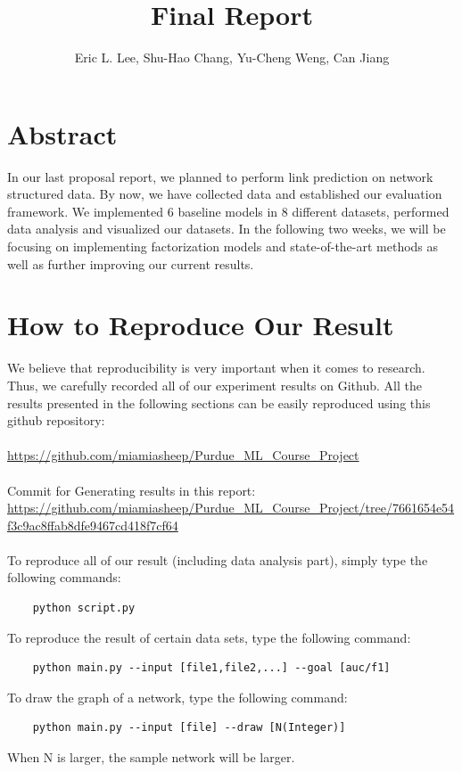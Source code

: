 \documentclass[12pt]{article}
\begin{document}
 
	\title{Final Report}
	\author{Eric L. Lee, Shu-Hao Chang, Yu-Cheng Weng, Can Jiang} 
	\maketitle
	
	\section{Abstract}
	
	In our last proposal report, we planned to perform link prediction on network structured data.
	By now, we have collected data and established our evaluation framework. We implemented 6 baseline models in 8 different datasets, performed data analysis and visualized our datasets. In the following two weeks, we will be focusing on implementing factorization models and state-of-the-art methods as well as further improving our current results. 
	
	\section{How to Reproduce Our Result}
	We believe that reproducibility is very important when it comes to research. Thus, we carefully recorded all of our experiment results on Github. All the results presented in the following sections can be easily reproduced using this github repository: 
	\\
	\\
	\url{https://github.com/miamiasheep/Purdue\_ML\_Course\_Project}
	\\
	\\
	Commit for Generating results in this report: \\
	\url{https://github.com/miamiasheep/Purdue_ML_Course_Project/tree/7661654e54f3c9ac8ffab8dfe9467cd418f7cf64}
	\\
	\\
	To reproduce all of our result (including data analysis part), simply type the following commands: 
	\begin{lstlisting}
	python script.py
	\end{lstlisting}
	To reproduce the result of certain data sets, type the following command:
	\begin{lstlisting}
	python main.py --input [file1,file2,...] --goal [auc/f1]
	\end{lstlisting}
	To draw the graph of a network, type the following command:
	\begin{lstlisting}
	python main.py --input [file] --draw [N(Integer)]
	\end{lstlisting}
	When N is larger, the sample network will be larger.
	
\end{document}
